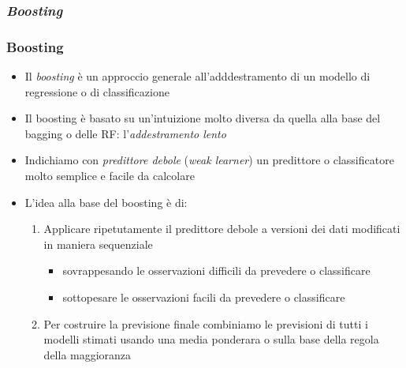 \subsubsection[Boosting]{\textit{Boosting}}
\begin{frame}
	\frametitle{Boosting}
	
	\begin{itemize}
		\item Il \emph{boosting} è un approccio generale all'adddestramento di un modello di regressione o di classificazione
		\item Il boosting è basato su un'intuizione molto diversa da quella alla base del bagging o delle RF: l'\emph{addestramento lento}
		\item Indichiamo con \emph{predittore debole} (\emph{weak learner}) un predittore o classificatore molto semplice e facile da calcolare
		\item L'idea alla base del boosting è di:
			\begin{enumerate}
				\item Applicare ripetutamente il predittore debole a versioni dei dati modificati in maniera sequenziale
					\begin{itemize}
						\item sovrappesando le osservazioni difficili da prevedere o classificare
						\item sottopesare le osservazioni facili da prevedere o classificare
					\end{itemize}
				\item Per costruire la previsione finale combiniamo le previsioni di tutti i modelli stimati usando una media ponderara o sulla base della regola della maggioranza
			\end{enumerate}
	\end{itemize}
\end{frame}



